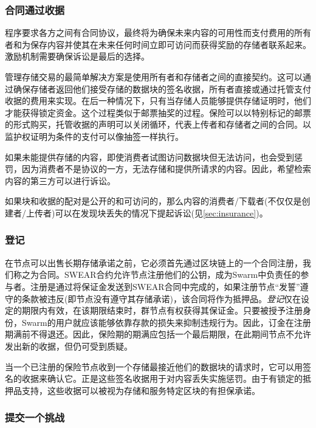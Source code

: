 \subsubsection{合同通过收据}

程序要求各方之间有合同协议，最终将为确保未来内容的可用性而支付费用的所有者和为保存内容并使其在未来任何时间立即可访问而获得奖励的存储者联系起来。激励机制需要确保诉讼是最后的选择。

管理存储交易的最简单解决方案是使用所有者和存储者之间的直接契约。这可以通过确保存储者返回他们接受存储的数据块的签名收据，所有者直接或通过托管支付收据的费用来实现。在后一种情况下，只有当存储人员能够提供存储证明时，他们才能获得锁定资金。这个过程类似于邮票抽奖的过程。保险可以以特别标记的邮票的形式购买，托管收据的声明可以关闭循环，代表上传者和存储者之间的合同。以监护权证明为条件的支付可以像抽签一样执行。

如果未能提供存储的内容，即使消费者试图访问数据块但无法访问，也会受到惩罚，因为消费者不是协议的一方，无法存储和提供所请求的内容。因此，希望检索内容的第三方可以进行诉讼。

如果块和收据的配对是公开的和可访问的，那么内容的消费者/下载者(不仅仅是创建者/上传者)可以在发现块丢失的情况下提起诉讼(见\ref{sec:insurance})。 

\subsubsection{登记}

在节点可以出售长期存储承诺之前，它必须首先通过区块链上的一个合同注册，我们称之为合同。SWEAR合约允许节点注册他们的公钥，成为Swarm中负责任的参与者。注册是通过将保证金发送到SWEAR合同中完成的，如果注册节点“发誓”遵守的条款被违反(即节点没有遵守其存储承诺)，该合同将作为抵押品。\emph{登记}仅在设定的期限内有效，在该期限结束时，群节点有权获得其保证金。只要被授予注册身份，Swarm的用户就应该能够依靠存款的损失来抑制违规行为。因此，订金在注册期满前不得退还。因此，保险期的期满应包括一个最后期限，在此期间节点不允许发出新的收据，但仍可受到质疑。

当一个已注册的保险节点收到一个存储最接近他们的数据块的请求时，它可以用签名的收据来确认它。正是这些签名收据用于对内容丢失实施惩罚。由于有锁定的抵押品支持，这些收据可以被视为存储和服务特定区块的有担保承诺。



\subsubsection{提交一个挑战}


